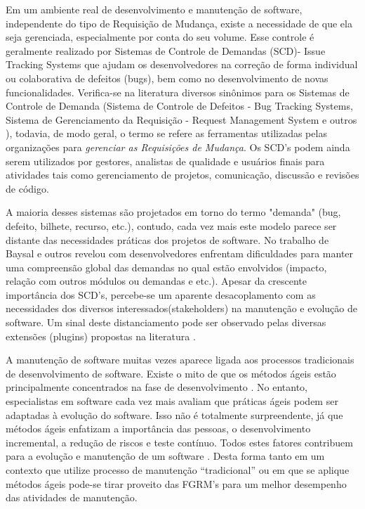 \documentclass[msc,proposal,hidelot,hideabstract]{ppgccufmg} %
\begin{document}
Em um ambiente real de desenvolvimento e manutenção de software, independente do tipo
de Requisição de Mudança, existe a necessidade de que ela seja gerenciada, especialmente por conta do seu volume. Esse controle é geralmente realizado por Sistemas de Controle de Demandas (SCD)- Issue Tracking Systems  que ajudam
os desenvolvedores na correção de forma individual ou colaborativa de defeitos (bugs), bem como no desenvolvimento de novas funcionalidades. Verifica-se na literatura diversos
sinônimos para os Sistemas de Controle de Demanda (Sistema de Controle de
Defeitos - Bug Tracking Systems, Sistema de Gerenciamento da Requisição -
Request Management System e outros ), todavia, de modo geral, o
termo se refere as ferramentas utilizadas pelas organizações para \textit{gerenciar as Requisições de Mudança}. Os SCD's podem ainda serem utilizados por gestores, analistas de qualidade e usuários finais para atividades tais como gerenciamento de projetos, comunicação, discussão e revisões
de código.

A maioria desses sistemas são projetados em torno do termo "demanda"
(bug, defeito, bilhete, recurso, etc.), contudo, cada vez mais este modelo parece
ser distante das necessidades práticas dos projetos de software. No trabalho de Baysal e outros \cite{Baysal:2013:SAP:2486788.2486957} revelou com desenvolvedores enfrentam dificuldades para manter uma compreensão global das demandas no qual estão envolvidos (impacto, relação com outros módulos ou demandas e etc.). Apesar da crescente importância dos SCD's, percebe-se um aparente desacoplamento com as necessidades dos diversos interessados(stakeholders) na manutenção e evolução de software. Um sinal deste distanciamento pode ser observado pelas diversas extensões (plugins) propostas na literatura \cite{101186,Thung:2014:BIT:2635868.2661678,Kononenko:2014:DED:2591062.2591075}.

A manutenção de software muitas vezes aparece ligada aos processos tradicionais
de desenvolvimento de software. Existe o mito de que os métodos ágeis estão
principalmente concentrados na fase de desenvolvimento
\cite{kajko2009model}. No entanto, especialistas em software cada vez mais
avaliam que práticas ágeis podem ser adaptadas à evolução do software. Isso não
é totalmente surpreendente, já que métodos ágeis enfatizam a importância das
pessoas, o desenvolvimento incremental, a redução de riscos e teste contínuo. Todos estes fatores contribuem para a evolução e manutenção de um software
\cite{thomas2006agile}. Desta forma tanto em um contexto que utilize processo de manutenção
``tradicional'' ou em que se aplique métodos ágeis pode-se tirar proveito das
FGRM's para um melhor desempenho das atividades de manutenção.
\end{document}
